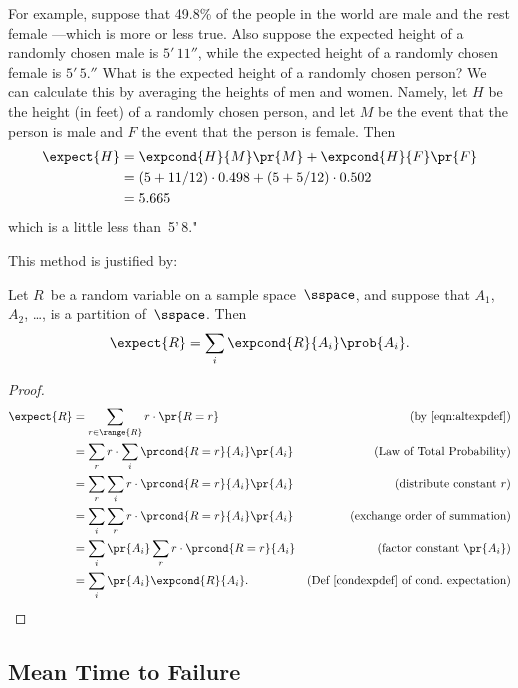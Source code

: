 For example, suppose that 49.8\% of the people in the world are male and
the rest female ---which is more or less true.  Also suppose the expected
height of a randomly chosen male is $5'\,11''$, while the expected height
of a randomly chosen female is $5'\,5.''$  What is the expected height of a
randomly chosen person?  We can calculate this by averaging the
heights of men and women.  Namely, let $H$ be the height (in feet) of a
randomly chosen person, and let $M$ be the event that the person is male
and $F$ the event that the person is female.  Then
\begin{align*}
\expect{H} &= \expcond{H}{M} \pr{M} + \expcond{H}{F} \pr{F}\\
&= (5 + 11/12) \cdot 0.498  + (5+ 5/12) \cdot 0.502\\
&= 5.665
\end{align*}
which is a little less than~5'\,8."

This method is justified by:

\begin{theorem}\label{total_expect} %
Let $R$~be a random variable on a sample space~$\sspace$, and suppose
that $A_1$, $A_2$, \dots, is a partition of~$\sspace$.  Then
\[
    \expect{R} = \sum_i \expcond{R}{A_i} \prob{A_i}.
\]
\end{theorem}

\begin{proof}
  \begin{align*}
    \expect{R} & = \sum_{r \in \range{R}} r \cdot \pr{R=r}
                   & \text{(by~\ref{eqn:altexpdef})}\\
    &= \sum_r r \cdot \sum_i \prcond{R=r}{A_i} \pr{A_i}
            & \text{(Law of Total Probability)}\\
    &= \sum_r \sum_i r \cdot \prcond{R=r}{A_i} \pr{A_i}
              & \text{(distribute constant $r$)}\\
    &= \sum_i \sum_r r \cdot \prcond{R=r}{A_i} \pr{A_i}
              & \text{(exchange order of summation)}\\
    &= \sum_i \pr{A_i} \sum_r r \cdot \prcond{R=r}{A_i}
             & \text{(factor constant $\pr{A_i}$)}\\
    &= \sum_i \pr{A_i} \expcond{R}{A_i}.
             & \text{(Def~\ref{condexpdef} of cond.\ expectation)}
  \end{align*}
\end{proof}


\subsection{Mean Time to Failure}\label{mean_time_to_failure_subsec}

